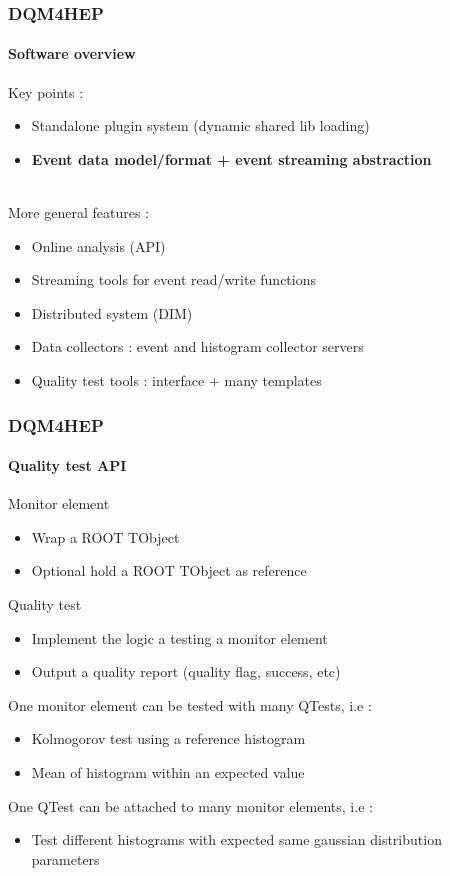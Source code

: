 \documentclass[presentation, 10pt]{beamer}
\begin{document}
\begin{frame}
  \frametitle{DQM4HEP}
  \framesubtitle{Software overview}
  \footnotesize
  Key points : 
  \begin{itemize}
    \item Standalone plugin system (dynamic shared lib loading) 
    \item \textbf{Event data model/format + event streaming abstraction}
  \end{itemize}
  ~ \\
  More general features :
  \begin{itemize}
    \item Online analysis (API)
    \item Streaming tools for event read/write functions
    \item Distributed system (DIM)
    \item Data collectors : event and histogram collector servers
    \item Quality test tools : interface + many templates
  \end{itemize}
\end{frame}


\begin{frame}
  \frametitle{DQM4HEP}
  \framesubtitle{Quality test API}
  \footnotesize
  \begin{block}{Monitor element}
    \begin{itemize}
      \item Wrap a ROOT TObject 
      \item Optional hold a ROOT TObject as reference
    \end{itemize}
  \end{block}
  \begin{block}{Quality test}
    \begin{itemize}
      \item Implement the logic a testing a monitor element
      \item Output a quality report (quality flag, success, etc)
    \end{itemize}
  \end{block}
  One monitor element can be tested with many QTests, i.e : \\
  \begin{itemize}
    \item Kolmogorov test using a reference histogram
    \item Mean of histogram within an expected value
  \end{itemize}
  One QTest can be attached to many monitor elements, i.e :
  \begin{itemize}
    \item Test different histograms with expected same gaussian distribution parameters
  \end{itemize}
\end{frame}
\end{document}
